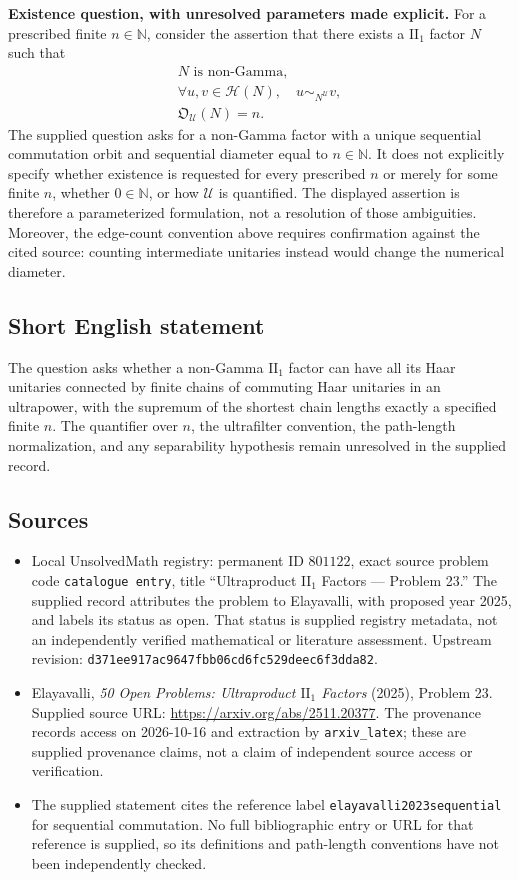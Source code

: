 \documentclass[11pt]{article}
\newcommand{\N}{\mathbb{N}}
\begin{document}
\textbf{Existence question, with unresolved parameters made explicit.}
For a prescribed finite \(n\in\N\), consider the assertion that there exists a \(\mathrm{II}_1\) factor \(N\) such that
\[
\begin{gathered}
N\text{ is non-Gamma},\\
\forall u,v\in\mathcal H(N),\quad u\sim_{N^{\mathcal U}}v,\\
\mathfrak O_{\mathcal U}(N)=n.
\end{gathered}
\]
The supplied question asks for a non-Gamma factor with a unique sequential commutation orbit and sequential diameter equal to \(n\in\N\). It does not explicitly specify whether existence is requested for every prescribed \(n\) or merely for some finite \(n\), whether \(0\in\N\), or how \(\mathcal U\) is quantified. The displayed assertion is therefore a parameterized formulation, not a resolution of those ambiguities. Moreover, the edge-count convention above requires confirmation against the cited source: counting intermediate unitaries instead would change the numerical diameter.
\subsection{Short English statement}
The question asks whether a non-Gamma \(\mathrm{II}_1\) factor can have all its Haar unitaries connected by finite chains of commuting Haar unitaries in an ultrapower, with the supremum of the shortest chain lengths exactly a specified finite \(n\). The quantifier over \(n\), the ultrafilter convention, the path-length normalization, and any separability hypothesis remain unresolved in the supplied record.
\subsection{Sources}
\begin{itemize}
\item Local UnsolvedMath registry: permanent ID \(801122\), exact source problem code \texttt{catalogue entry}, title ``Ultraproduct \(\mathrm{II}_1\) Factors --- Problem 23.'' The supplied record attributes the problem to Elayavalli, with proposed year 2025, and labels its status as open. That status is supplied registry metadata, not an independently verified mathematical or literature assessment. Upstream revision: \texttt{d371ee917ac9647fbb06cd6fc529deec6f3dda82}.
\item Elayavalli, \emph{50 Open Problems: Ultraproduct \(\mathrm{II}_1\) Factors} (2025), Problem 23. Supplied source URL: \url{https://arxiv.org/abs/2511.20377}. The provenance records access on 2026-10-16 and extraction by \texttt{arxiv\_latex}; these are supplied provenance claims, not a claim of independent source access or verification.
\item The supplied statement cites the reference label \texttt{elayavalli2023sequential} for sequential commutation. No full bibliographic entry or URL for that reference is supplied, so its definitions and path-length conventions have not been independently checked.
\end{itemize}
\end{document}
